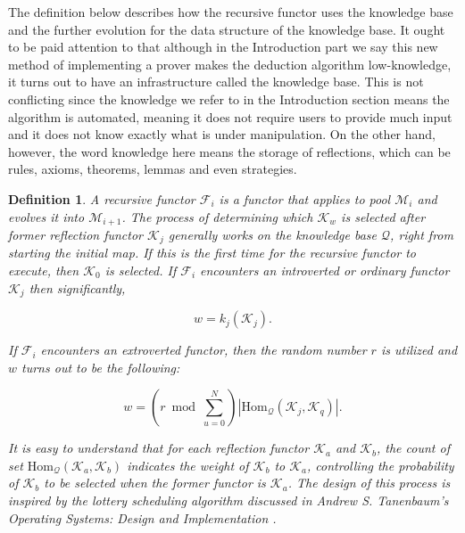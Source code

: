 \documentclass{aims}
\numberwithin{equation}{section}
\newtheorem{definition}{Definition}	%
\numberwithin{theorem}{section}	%
\numberwithin{axiom}{section}	%
\numberwithin{definition}{section}	%
\begin{document}
	The definition below describes how the recursive functor uses the knowledge base and the further evolution for the data structure of the knowledge base. It ought to be paid attention to that although in the Introduction part  we say this new method of implementing a prover makes the deduction algorithm low-knowledge, it turns out to have an infrastructure called the knowledge base. This is not conflicting since the knowledge we refer to in the Introduction section means the algorithm is automated, meaning it does not require users to provide much input and it does not know exactly what is under manipulation. On the other hand, however, the word knowledge here means the storage of reflections, which can be rules, axioms, theorems, lemmas and even strategies.
	
	\begin{definition}
		A recursive functor \(\mathcal{F}_i\) is a functor that applies to pool \(\mathcal{M}_i\) and evolves it into \(\mathcal{M}_{i+1}\). The process of determining which \(\mathcal{K}_w\) is{ selected} after former reflection functor \(\mathcal{K}_j\) generally works on the knowledge base \(\mathcal{Q}\), right from starting the initial map. If this is the first time for the recursive functor to execute, then \(\mathcal{K}_0\) is selected. If \(\mathcal{F}_i\) encounters an introverted or ordinary functor \(\mathcal{K}_j\) then significantly,
		
		\begin{equation}
			w = k_j\left(\mathcal{K}_j\right).
		\end{equation}
		
		If \(\mathcal{F}_i\) encounters an extroverted functor, then the random number \(\mathit{r}\) is utilized and \(w\) turns out to be the following:
		
		\begin{equation}
			w = (\mathit{r} \bmod \sum _{u=0}^N )\left|\text{Hom}_{\mathcal{Q}}\left(\mathcal{K}_j,\mathcal{K}_q\right)\right|.
		\end{equation}
		
		It is easy to understand that for each reflection functor \(\mathcal{K}_a\) and \(\mathcal{K}_b\), the count of set \(\text{Hom}_{\mathcal{Q}}\left(\mathcal{K}_a,\mathcal{K}_b\right)\) indicates the{ weight} of \(\mathcal{K}_b\) to \(\mathcal{K}_a\), controlling the probability of \(\mathcal{K}_b\) to be selected when the former functor is \(\mathcal{K}_a\). The design of this process is inspired by the lottery scheduling algorithm discussed in Andrew S. Tanenbaum{'}s Operating Systems: Design and Implementation \cite{Tanenbaum2015}.
	\end{definition}
	
\end{document}

